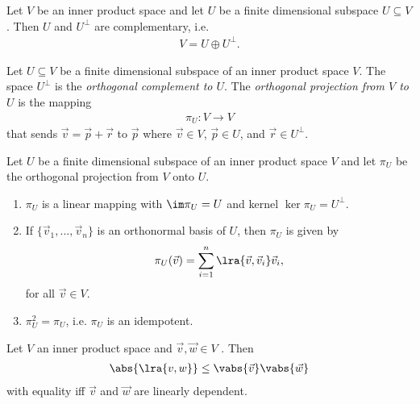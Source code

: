 \documentclass{article}
\begin{document}
\begin{proposition}[Notes 5.2.2]
	Let $V$ be an inner product space and let $U$ be a finite dimensional subspace $U\subseteq V$.
	Then $U$ and $U^\bot$ are complementary, i.e. 
	\begin{align*}
		V = U\oplus U^\bot.
	\end{align*}	
\end{proposition}

\begin{definition}
	Let $U\subseteq V$ be a finite dimensional subspace of an inner product space $V$. The space $U^\bot$
	is the \emph{orthogonal complement to $U$}. The \emph{orthogonal projection from $V$ to $U$} is 
	the mapping 
	\begin{align*}
		\pi_U:V\to V
	\end{align*}
	that sends $\vec v = \vec p + \vec r$ to $\vec p$ where $\vec v\in V$, $\vec p\in U$, and $\vec r\in U^\bot$.
\end{definition}

\begin{proposition}[Notes 5.2.4]
	Let $U$ be a finite dimensional subspace of an inner product space $V$ and let $\pi_U$ be the 
	orthogonal projection from $V$ onto $U$.	
	\begin{enumerate}
		\item $\pi_U$ is a linear mapping with $\im \pi_U=U$ and kernel $\ker \pi_U = U^\bot$.
		\item If $\{\vec v_1,...,\vec v_n\}$ is an orthonormal basis of $U$, then $\pi_U$ is given 
			by
			\begin{align*}
				\pi_U(\vec v)=\sum_{i=1}^n\lra{\vec v,\vec v_i}\vec v_i,
			\end{align*}
			for all $\vec v\in V$.
		\item $\pi_U^2=\pi_U$, i.e. $\pi_U$ is an idempotent.
	\end{enumerate}
\end{proposition}

\begin{theorem}
	Let $V$ an inner product space and $\vec v,\vec w\in V$ . Then 
	\begin{align*}
		\abs{\lra{v,w}}\leq \vabs{\vec v}\vabs{\vec w}
	\end{align*}
	with equality iff $\vec v$ and $\vec w$ are linearly dependent.
\end{theorem}
\end{document}
